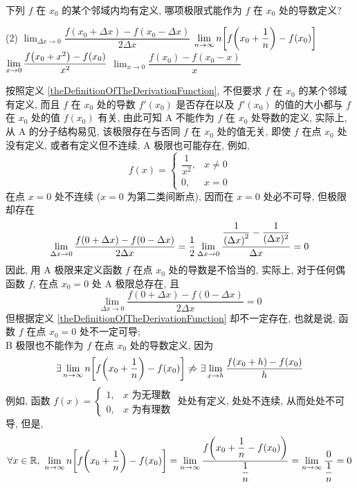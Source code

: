 \begin{example}
    下列 $f$ 在 $x_0$ 的某个邻域内均有定义, 哪项极限式能作为 $f$ 在 $x_0$ 处的导数定义?
    \begin{tasks}(2)
        \task $\displaystyle \lim_{\Delta x\to0}\dfrac{f(x_0+\Delta x)-f(x_0-\Delta x)}{2\Delta x}$
        \task $\displaystyle \lim_{n\to\infty}n\qty[f\qty(x_0+\dfrac{1}{n})-f(x_0)]$
        \task $\displaystyle \lim_{x\to0}\dfrac{f\qty(x_0+x^2)-f(x_0)}{x^2}$
        \task $\displaystyle \lim_{x\to0}\dfrac{f(x_0)-f(x_0-x)}{x}$
    \end{tasks}
\end{example}
\begin{solution}
    按照定义 \ref{theDefinitionOfTheDerivationFunction}, 不但要求 $f$ 在 $x_0$ 的某个邻域有定义, 而且 $f$ 在 $x_0$ 处的导数 $f'(x_0)$ 是否存在以及 $f'(x_0)$ 的值的大小都与 $f$ 在 $x_0$ 处的值 $f(x_0)$ 有关, 由此可知 A 不能作为 $f$ 在 $x_0$ 处导数的定义,
    实际上, 从 A 的分子结构易见, 该极限存在与否同 $f$ 在 $x_0$ 处的值无关, 即使 $f$ 在点 $x_0$ 处没有定义, 或者有定义但不连续, A 极限也可能存在, 例如, $$f(x)=\begin{cases}
            \dfrac{1}{x^2}, & x\neq0 \\[6pt]
            0,              & x=0
        \end{cases}$$在点 $x=0$ 处不连续 ($x=0$ 为第二类间断点), 因而在 $x=0$ 处必不可导, 但极限却存在 $$\lim_{\Delta x\to0}\dfrac{f(0+\Delta x)-f(0-\Delta x)}{2\Delta x }=\dfrac{1}{2}\lim_{\Delta x\to0}\dfrac{\dfrac{1}{\qty(\Delta x)^2}-\dfrac{1}{(\Delta x)^2}}{\Delta x}=0$$
    因此, 用 A 极限来定义函数 $f$ 在点 $x_0$ 处的导数是不恰当的, 实际上, 对于任何偶函数 $f$, 在点 $x_0=0$ 处 A 极限总存在, 且 $$\lim_{\Delta x\to0}\dfrac{f(0+\Delta x)-f(0-\Delta x)}{2\Delta x}=0$$
    但根据定义 \ref{theDefinitionOfTheDerivationFunction} 却不一定存在, 也就是说, 函数 $f$ 在点 $x_0=0$ 处不一定可导;\\
    B 极限也不能作为 $f$ 在点 $x_0$ 处的导数定义, 因为
    $$\exists\lim_{n\to\infty}n\qty[f\qty(x_0+\dfrac{1}{n})-f(x_0)]\not\Rightarrow \exists\lim_{x\to h}\dfrac{f(x_0+h)-f(x_0)}{h}$$
    例如, 函数 $f(x)=\begin{cases}
            1, & x\text{ 为无理数} \\
            0, & x\text{ 为有理数}
        \end{cases}$ 处处有定义, 处处不连续, 从而处处不可导, 但是, $$\forall x\in\mathbb{R},~\lim_{n\to\infty}n\qty[f\qty(x_0+\dfrac{1}{n})-f(x_0)]=\lim_{n\to\infty}\dfrac{f\qty(x_0+\dfrac{1}{n}-f(x_0))}{\dfrac{1}{n}}=\lim_{n\to\infty}\dfrac{0}{\dfrac{1}{n}}=0$$

\end{solution}
